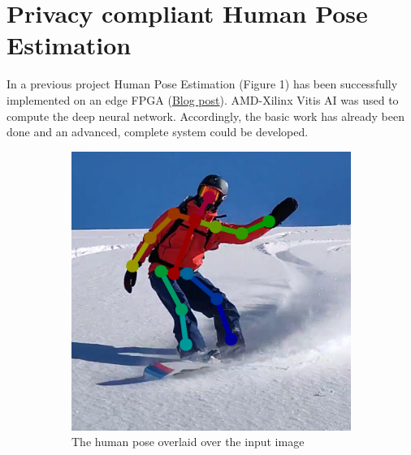 \documentclass[a4paper,12pt]{book}
\begin{document}
\section*{Privacy compliant Human Pose Estimation}

In a previous project Human Pose Estimation (Figure 1) has been successfully implemented on an edge FPGA (\href{https://www.hackster.io/michi_michi/hardware-accelerated-human-pose-estimation-kv260-ias-cam-d5ebb9}{Blog post}).
AMD-Xilinx Vitis AI was used to compute the deep neural network.
Accordingly, the basic work has already been done and an advanced, complete system could be developed.

\begin{figure}[ht!]  
    \begin{subfigure}[t]{.45\textwidth}
    \center
    \includegraphics[width=1\linewidth]{images/board.png}
    \caption{The human pose overlaid over the input image}
    \label{fig:board}
  \end{subfigure}
  \hspace{2em}
  \begin{subfigure}[t]{.45\textwidth}
    \center

\end{subfigure}
\end{figure}
\end{document}

